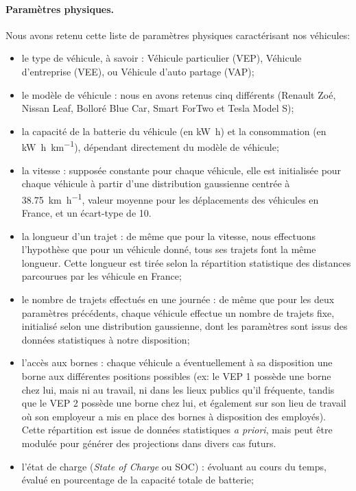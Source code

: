 		
		\paragraph{Paramètres physiques.} Nous avons retenu cette liste de paramètres physiques caractérisant nos véhicules:
		\begin{itemize}
			\item le type de véhicule, à savoir : Véhicule particulier (VEP), Véhicule d'entreprise (VEE), ou Véhicule d'auto partage (VAP);
			\item le modèle de véhicule : nous en avons retenus cinq différents (Renault Zoé, Nissan Leaf, Bolloré Blue Car, Smart ForTwo et Tesla Model S);
			\item la capacité de la batterie du véhicule (en \si{\kilo\watt\hour}) et la consommation (en \si{\kilo\watt\hour\per\kilo\meter}), dépendant directement du modèle de véhicule;
			\item la vitesse : supposée constante pour chaque véhicule, elle est initialisée pour chaque véhicule à partir d'une distribution gaussienne centrée à \SI{38,75}{\kilo\meter\per\hour}, valeur moyenne pour les déplacements des véhicules en France, et un écart-type de 10.
			\item la longueur d'un trajet : de même que pour la vitesse, nous effectuons l'hypothèse que pour un véhicule donné, tous ses trajets font la même longueur. Cette longueur est tirée selon la répartition statistique des distances parcourues par les véhicule en France;
			\item le nombre de trajets effectués en une journée : de même que pour les deux paramètres précédents, chaque véhicule effectue un nombre de trajets fixe, initialisé selon une distribution gaussienne, dont les paramètres sont issus des données statistiques à notre disposition;
			\item l'accès aux bornes : chaque véhicule a éventuellement à sa disposition une borne aux différentes positions possibles (ex: le VEP \no{}1 possède une borne chez lui, mais ni au travail, ni dans les lieux publics qu'il fréquente, tandis que le VEP \no{}2 possède une borne chez lui, et également sur son lieu de travail où son employeur a mis en place des bornes à disposition des employés). Cette répartition est issue de données statistiques \emph{a priori}, mais peut être modulée pour générer des projections dans divers cas futurs.  
			\item l'état de charge (\emph{State of Charge} ou SOC) : évoluant au cours du temps, évalué en pourcentage de la capacité totale de batterie;

\end{itemize}
